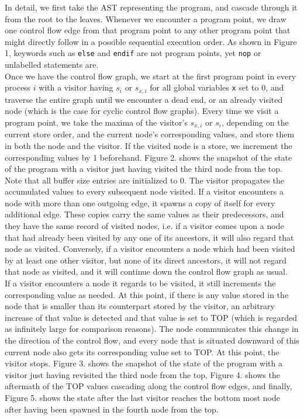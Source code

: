 In detail, we first take the AST representing the program, and cascade through it from the root to the leaves. Whenever we encounter a program point, we draw one control flow edge from that program point to any other program point that might directly follow in a possible sequential execution order. As shown in Figure 1, keywords such as \lstinline$else$ and \lstinline$endif$ are not program points, yet \lstinline$nop$ or unlabelled statements are.\\

Once we have the control flow graph, we start at the first program point in every process $i$ with a visitor having $s_i$ or $s_{x, i}$ for all global variables \lstinline$x$ set to $0$, and traverse the entire graph until we encounter a dead end, or an already visited node (which is the case for cyclic control flow graphs). Every time we visit a program point, we take the maxima of the visitor's $s_{x, i}$ or $s_i$, depending on the current store order, and the current node's corresponding values, and store them in both the node and the visitor. If the visited node is a store, we increment the corresponding values by 1 beforehand. Figure 2. shows the snapshot of the state of the program with a visitor just having visited the third node from the top.\\

Note that all buffer size entries are initialized to $0$. The visitor propagates the accumulated values to every subsequent node visited. If a visitor encounters a node with more than one outgoing edge, it spawns a copy of itself for every additional edge. These copies carry the same values as their predecessors, and they have the same record of visited nodes, i.e. if a visitor comes upon a node that had already been visited by any one of its ancestors, it will also regard that node as visited. Conversely, if a visitor encounters a node which had been visited by at least one other visitor, but none of its direct ancestors, it will not regard that node as visited, and it will continue down the control flow graph as usual.\\

If a visitor encounters a node it regards to be visited, it still increments the corresponding value as needed. At this point, if there is any value stored in the node that is smaller than its counterpart stored by the visitor, an arbitrary increase of that value is detected and that value is set to TOP (which is regarded as infinitely large for comparison reasons). The node communicates this change in the direction of the control flow, and every node that is situated downward of this current node also gets its corresponding value set to TOP. At this point, the visitor stops. Figure 3. shows the snapshot of the state of the program with a visitor just having revisited the third node from the top, Figure 4. shows the aftermath of the TOP values cascading along the control flow edges, and finally, Figure 5. shows the state after the last visitor reaches the bottom most node after having been spawned in the fourth node from the top.\\

